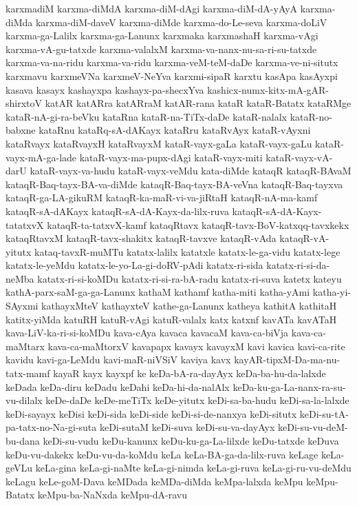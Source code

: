 {karxmadiM
karxma-diMdA
karxma-diM-dAgi
karxma-diM-dA-yAyA
karxma-diMda
karxma-diM-daveV
karxma-diMde
karxma-do-Le-seva
karxma-doLiV
karxma-ga-Lalilx
karxma-ga-Lanunx
karxmaka
karxmashaH
karxma-vAgi
karxma-vA-gu-tatxde
karxma-valalxM
karxma-va-nanx-nu-sa-ri-su-tatxde
karxma-va-na-ridu
karxma-va-ridu
karxma-veM-teM-daDe
karxma-ve-ni-situtx
karxmavu
karxmeVNa
karxmeV-NeYva
karxmi-sipaR
karxtu
kasApa
kasAyxpi
kasava
kasayx
kashayxpa
kashayx-pa-shecxYva
kashicx-numx-kitx-mA-gAR-shirxtoV
katAR
katARra
katARraM
katAR-rana
kataR
kataR-Batatx
kataRMge
kataR-nA-gi-ra-beVku
kataRna
kataR-na-TiTx-daDe
kataR-nalalx
kataR-no-babxne
kataRnu
kataRq-sA-dAKayx
kataRru
kataRvAyx
kataR-vAyxni
kataRvayx
kataRvayxH
kataRvayxM
kataR-vayx-gaLa
kataR-vayx-gaLu
kataR-vayx-mA-ga-lade
kataR-vayx-ma-pupx-dAgi
kataR-vayx-miti
kataR-vayx-vA-darU
kataR-vayx-va-hudu
kataR-vayx-veMdu
kata-diMde
kataqR
kataqR-BAvaM
kataqR-Baq-tayx-BA-va-diMde
kataqR-Baq-tayx-BA-veVna
kataqR-Baq-tayxva
kataqR-ga-LA-gikuRM
kataqR-ka-maR-vi-va-jiRtaH
kataqR-nA-ma-kamf
kataqR-sA-dAKayx
kataqR-sA-dA-Kayx-da-lilx-ruva
kataqR-sA-dA-Kayx-tatatxvX
kataqR-ta-tatxvX-kamf
kataqRtavx
kataqR-tavx-BoV-katxqq-tavxkekx
kataqRtavxM
kataqR-tavx-shakitx
kataqR-tavxve
kataqR-vAda
kataqR-vA-yitutx
kataq-tavxR-muMTu
katatx-lalilx
katatxle
katatx-le-ga-vidu
katatx-lege
katatx-le-yeMdu
katatx-le-yo-La-gi-doRV-pAdi
katatx-ri-sida
katatx-ri-si-da-neMba
katatx-ri-si-koMDu
katatx-ri-si-ra-bA-radu
katatx-ri-suva
katetx
kateyu
kathA-parx-saM-ga-ga-Lanunx
kathaM
kathamf
katha-miti
katha-yAmi
katha-yi-SAyxmi
kathayxMteV
kathayxteV
kathe-ga-Lanunx
katheya
kathitA
kathitaH
katitx-yiMda
katuRH
katuR-vAgi
katuR-valalx
katx
katxnf
kavATa
kavATaH
kava-LiV-ka-ri-si-koMDu
kava-cAya
kavaca
kavacaM
kava-ca-biVja
kava-ca-maMtarx
kava-ca-maMtorxV
kavapapx
kavayx
kavayxM
kavi
kavica
kavi-ca-rite
kavidu
kavi-ga-LeMdu
kavi-maR-niVSiV
kaviya
kavx
kayAR-tipxM-Da-ma-nu-tatx-mamf
kayaR
kayx
kayxpf
ke
keDa-bA-ra-dayAyx
keDa-ba-hu-da-lalxde
keDada
keDa-diru
keDadu
keDahi
keDa-hi-da-nalAlx
keDa-ku-ga-La-nanx-ra-su-vu-dilalx
keDe-daDe
keDe-meTiTx
keDe-yitutx
keDi-sa-ba-hudu
keDi-sa-la-lalxde
keDi-sayayx
keDisi
keDi-sida
keDi-side
keDi-si-de-nanxya
keDi-situtx
keDi-su-tA-pa-tatx-no-Na-gi-suta
keDi-sutaM
keDi-suva
keDi-su-va-dayAyx
keDi-su-vu-deM-bu-dana
keDi-su-vudu
keDu-kanunx
keDu-ku-ga-La-lilxde
keDu-tatxde
keDuva
keDu-vu-dakekx
keDu-vu-da-koMdu
keLa
keLa-BA-ga-da-lilx-ruva
keLage
keLa-geVLu
keLa-gina
keLa-gi-naMte
keLa-gi-nimda
keLa-gi-ruva
keLa-gi-ru-vu-deMdu
keLagu
keLe-goM-Dava
keMDada
keMDa-diMda
keMpa-lalxda
keMpu
keMpu-Batatx
keMpu-ba-NaNxda
keMpu-dA-ravu
}
